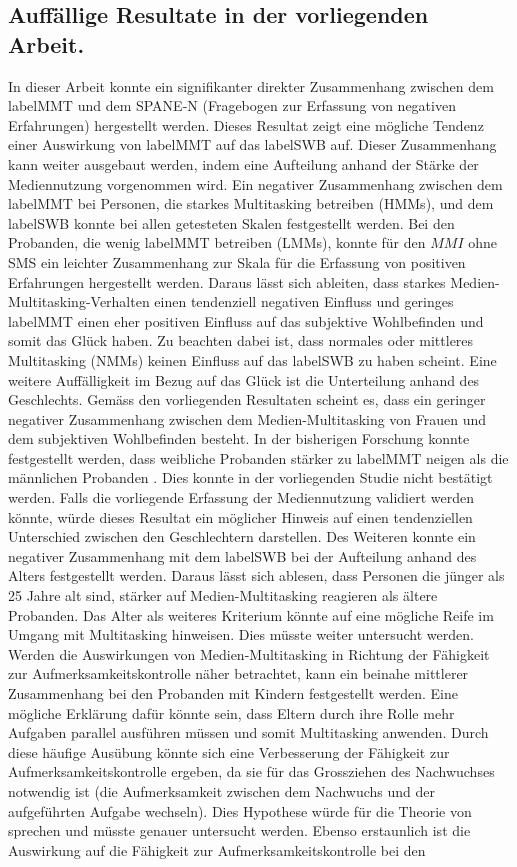 \subsection{Auffällige Resultate in der vorliegenden Arbeit.}
In dieser Arbeit konnte ein signifikanter direkter Zusammenhang zwischen dem \gls{labelMMT} und dem SPANE-N (Fragebogen zur Erfassung von negativen Erfahrungen) hergestellt werden. Dieses Resultat zeigt eine mögliche Tendenz einer Auswirkung von \gls{labelMMT} auf das \gls{labelSWB} auf. Dieser Zusammenhang kann weiter ausgebaut werden, indem eine Aufteilung anhand der Stärke der Mediennutzung vorgenommen wird. Ein negativer Zusammenhang zwischen dem \gls{labelMMT} bei Personen, die starkes Multitasking betreiben (HMMs), und dem \gls{labelSWB} konnte bei allen getesteten Skalen festgestellt werden. Bei den Probanden, die wenig \gls{labelMMT} betreiben (LMMs), konnte für den $MMI$ ohne SMS ein leichter Zusammenhang zur Skala für die Erfassung von positiven Erfahrungen hergestellt werden. Daraus lässt sich ableiten, dass starkes Medien-Multitasking-Verhalten einen tendenziell negativen Einfluss und geringes \gls{labelMMT} einen eher positiven Einfluss auf das subjektive Wohlbefinden und somit das Glück haben. Zu beachten dabei ist, dass normales oder mittleres Multitasking (NMMs) keinen Einfluss auf das \gls{labelSWB} zu haben scheint. Eine weitere Auffälligkeit im Bezug auf das Glück ist die Unterteilung anhand des Geschlechts. Gemäss den vorliegenden Resultaten scheint es, dass ein geringer negativer Zusammenhang zwischen dem Medien-Multitasking von Frauen und dem subjektiven Wohlbefinden besteht. In der bisherigen Forschung konnte festgestellt werden, dass weibliche Probanden stärker zu \gls{labelMMT} neigen als die männlichen Probanden \cite{Rideout2010}. Dies konnte in der vorliegenden Studie nicht bestätigt werden. Falls die vorliegende Erfassung der Mediennutzung validiert werden könnte, würde dieses Resultat ein möglicher Hinweis auf einen tendenziellen Unterschied zwischen den Geschlechtern darstellen. Des Weiteren konnte ein negativer Zusammenhang mit dem \gls{labelSWB} bei der Aufteilung anhand des Alters festgestellt werden. Daraus lässt sich ablesen, dass Personen die jünger als 25 Jahre alt sind, stärker auf Medien-Multitasking reagieren als ältere Probanden. Das Alter als weiteres Kriterium könnte auf eine mögliche Reife im Umgang mit Multitasking hinweisen. Dies müsste weiter untersucht werden. Werden die Auswirkungen von Medien-Multitasking in Richtung der Fähigkeit zur Aufmerksamkeitskontrolle näher betrachtet, kann ein beinahe mittlerer Zusammenhang bei den Probanden mit Kindern festgestellt werden. Eine mögliche Erklärung dafür könnte sein, dass Eltern durch ihre Rolle mehr Aufgaben parallel ausführen müssen und somit Multitasking anwenden. Durch diese häufige Ausübung könnte sich eine Verbesserung der Fähigkeit zur Aufmerksamkeitskontrolle ergeben, da sie für das Grossziehen des Nachwuchses notwendig ist (die Aufmerksamkeit zwischen dem Nachwuchs und der aufgeführten Aufgabe wechseln). Dies Hypothese würde für die Theorie von  sprechen und müsste genauer untersucht werden. Ebenso erstaunlich ist die Auswirkung auf die Fähigkeit zur Aufmerksamkeitskontrolle bei den 